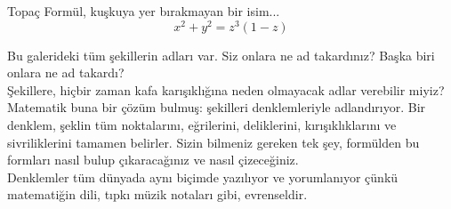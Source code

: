 \begin{surferPage}{Topaç}
Formül, kuşkuya yer bırakmayan bir isim... \\
\smallskip
\[x^2 + y^2	= z^3	(1 - z) \]


\singlespacing
Bu galerideki tüm şekillerin adları var. Siz onlara ne ad takardınız? Başka biri onlara ne ad takardı?\\
\vspace{0.3cm}
Şekillere, hiçbir zaman kafa karışıklığına  neden olmayacak adlar verebilir miyiz?  Matematik buna bir çözüm bulmuş: şekilleri denklemleriyle adlandırıyor. Bir denklem, şeklin tüm noktalarını, eğrilerini, deliklerini, kırışıklıklarını ve sivriliklerini tamamen belirler. Sizin bilmeniz gereken tek şey, formülden bu formları nasıl bulup çıkaracağınız ve nasıl çizeceğiniz.\\
\vspace{0.3cm}
Denklemler tüm dünyada aynı biçimde yazılıyor ve yorumlanıyor çünkü matematiğin dili, tıpkı müzik notaları gibi, evrenseldir.
\end{surferPage}
